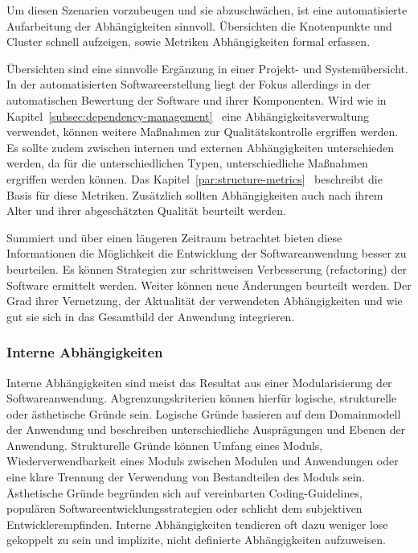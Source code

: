 Um diesen Szenarien vorzubeugen und sie abzuschwächen, ist eine automatisierte Aufarbeitung der Abhängigkeiten sinnvoll. Übersichten die Knotenpunkte und Cluster schnell aufzeigen, sowie Metriken Abhängigkeiten formal erfassen.

Übersichten sind eine sinnvolle Ergänzung in einer Projekt- und Systemübersicht. In der automatisierten Softwareerstellung liegt der Fokus allerdings in der automatischen Bewertung der Software und ihrer Komponenten. Wird wie in Kapitel~\ref{subsec:dependency-management}~ eine Abhängigkeitsverwaltung verwendet, können weitere Maßnahmen zur Qualitätskontrolle ergriffen werden. Es sollte zudem zwischen internen und externen Abhängigkeiten unterschieden werden, da für die unterschiedlichen Typen, unterschiedliche Maßnahmen ergriffen werden können. Das Kapitel~\ref{par:structure-metrics}~ beschreibt die Basis für diese Metriken. Zusätzlich sollten Abhängigkeiten auch nach ihrem Alter und ihrer abgeschätzten Qualität beurteilt werden.

Summiert und über einen längeren Zeitraum betrachtet bieten diese Informationen die Möglichkeit die Entwicklung der Softwareanwendung besser zu beurteilen. Es können Strategien zur schrittweisen Verbesserung (refactoring) der Software ermittelt werden. Weiter können neue Änderungen beurteilt werden. Der Grad ihrer Vernetzung, der Aktualität der verwendeten Abhängigkeiten und wie gut sie sich in das Gesamtbild der Anwendung integrieren.

\subsubsection{Interne Abhängigkeiten}

Interne Abhängigkeiten sind meist das Resultat aus einer Modularisierung der Softwareanwendung. Abgrenzungskriterien können hierfür logische, strukturelle oder ästhetische Gründe sein. Logische Gründe basieren auf dem Domainmodell der Anwendung und beschreiben unterschiedliche Ausprägungen und Ebenen der Anwendung. Strukturelle Gründe können Umfang eines Moduls, Wiederverwendbarkeit eines Moduls zwischen Modulen und Anwendungen oder eine klare Trennung der Verwendung von Bestandteilen des Moduls sein. Ästhetische Gründe begründen sich auf vereinbarten Coding-Guidelines, populären Softwareentwicklungsstrategien oder schlicht dem subjektiven Entwicklerempfinden. Interne Abhängigkeiten tendieren oft dazu weniger lose gekoppelt zu sein und implizite, nicht definierte Abhängigkeiten aufzuweisen.

